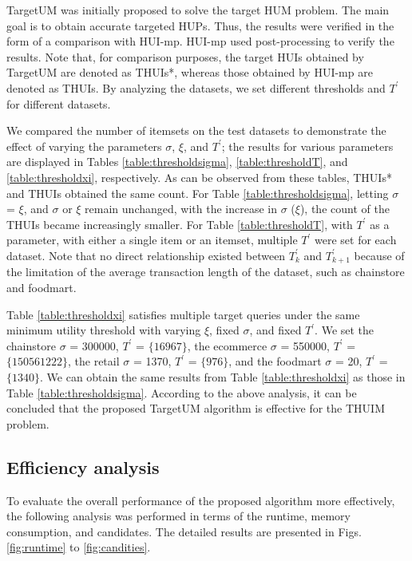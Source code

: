 \documentclass[journal]{IEEEtran}
\begin{document}
TargetUM was initially proposed to solve the target HUM problem. The main goal is to obtain accurate targeted HUPs. Thus, the results were verified in the form of a comparison with HUI-mp. HUI-mp used post-processing to verify the results. Note that, for comparison purposes, the target HUIs obtained by TargetUM are denoted as THUIs*, whereas those obtained by HUI-mp are denoted as THUIs. By analyzing the datasets, we set different thresholds and $T^\prime$ for different datasets.

We compared the number of itemsets on the test datasets to demonstrate the effect of varying the parameters $\sigma$, $\xi$, and $T^\prime$; the results for various parameters are displayed in Tables \ref{table:thresholdsigma}, \ref{table:thresholdT}, and \ref{table:thresholdxi}, respectively. As can be observed from these tables, THUIs* and THUIs obtained the same count. For Table \ref{table:thresholdsigma}, letting $\sigma$ = $\xi$, and $\sigma$ or $\xi$ remain unchanged, with the increase in $\sigma$ ($\xi$), the count of the THUIs became increasingly smaller. For Table \ref{table:thresholdT}, with $T^\prime$ as a parameter, with either a single item or an itemset, multiple $T^\prime$ were set for each dataset. Note that no direct relationship existed between $T^\prime_k$ and $T^\prime_{k+1}$ because of the limitation of the average transaction length of the dataset, such as chainstore and foodmart.

Table \ref{table:thresholdxi} satisfies multiple target queries under the same minimum utility threshold with varying $\xi$, fixed $\sigma$, and fixed $T^\prime$. We set the chainstore $\sigma$ = 300000, $T^\prime$ = $\{16967\}$, the ecommerce $\sigma$ = 550000, $T^\prime$ = $\{150561222\}$, the retail $\sigma$ = 1370, $T^\prime$ = $\{976\}$, and the foodmart $\sigma$ = 20, $T^\prime$ = $\{1340\}$. We can obtain the same results from Table \ref{table:thresholdxi} as those in Table \ref{table:thresholdsigma}. According to the above analysis, it can be concluded that the proposed TargetUM algorithm is effective for the THUIM problem.

\subsection{Efficiency analysis}


To evaluate the overall performance of the proposed algorithm more effectively, the following analysis was performed in terms of the runtime, memory consumption, and candidates. The detailed results are presented in Figs. \ref{fig:runtime} to \ref{fig:candities}.
\end{document}
